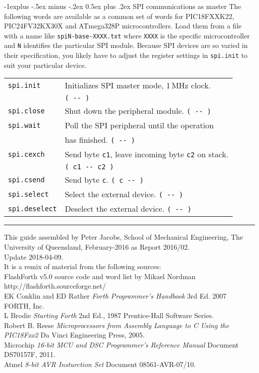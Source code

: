 \documentclass[10pt,landscape,a4paper]{article}
\makeatletter
\renewcommand{\subsection}{\@startsection{subsection}{2}{0mm}%
                                {-1explus -.5ex minus -.2ex}%
                                {0.5ex plus .2ex}%
                                {\normalfont\normalsize\bfseries}}
\makeatother
\begin{document}
\begin{multicols}{3}
\medskip

\subsection{SPI communications as master}
The following words are available as a common set of words for PIC18FXXK22, 
PIC24FV32KX30X and ATmega328P microcontrollers.
Load them from a file with a name like \verb!spiN-base-XXXX.txt! where \verb!XXXX!
is the specific microcontroller and \verb!N! identifies the particular SPI module.
Because SPI devices are so varied in their specification, you likely have to 
adjust the register settings in \verb!spi.init! to suit your particular device.
\begin{tabular}{@{}ll@{}}
\verb!spi.init!  & Initializes SPI master mode, 1\,MHz clock. \\
                 & \verb!( -- ) !\\
\verb!spi.close! & Shut down the peripheral module. \verb!( -- )! \\ 
\verb!spi.wait!  & Poll the SPI peripheral until the operation \\
                 & has finished. \verb!( -- )! \\
\verb!spi.cexch! & Send byte \verb!c1!, leave incoming byte \verb!c2! on stack. \\
                 & \verb!( c1 -- c2 )! \\
\verb!spi.csend! & Send byte \verb!c!. \verb!( c -- )! \\
\verb!spi.select! & Select the external device. \verb!( -- )! \\
\verb!spi.deselect! & Deselect the external device. \verb!( -- )! \\
\end{tabular}


\rule{0.3\linewidth}{0.25pt}
\scriptsize

This guide assembled by Peter Jacobs, School of Mechanical Engineering,
The University of Queensland, February-2016 as Report 2016/02. \\
Update 2018-04-09. \\
It is a remix of material from the following sources:\\
FlashForth v5.0 source code and word list by Mikael Nordman \\
http://flashforth.sourceforge.net/ \\
EK Conklin and ED Rather \textit{Forth Programmer's Handbook} 3rd Ed. 2007 FORTH, Inc.\\
L Brodie \textit{Starting Forth} 2nd Ed., 1987 Prentice-Hall Software Series.\\
Robert B. Reese \textit{Microprocessors from Assembly Language to C 
Using the PIC18Fxx2} Da Vinci Engineering Press, 2005.\\
Microchip \textit{16-bit MCU and DSC Programmer’s Reference Manual} Document DS70157F, 2011.\\
Atmel \textit{8-bit AVR Insturction Set} Document 08561-AVR-07/10.\\

\end{multicols}
\end{document}
